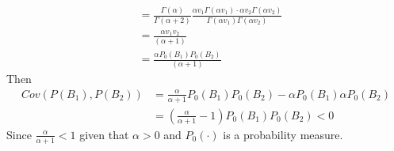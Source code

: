 \documentclass[a4paper, 10pt]{article}
\newcommand{\ds}{ \displaystyle }
\newcommand{\alphaPo}[1]{ \alpha P_0(#1) }
\newcommand{\Bi}[1]{B_#1}
\begin{document}
\begin{enumerate}
\begin{align*}
                        &= \ds\frac{\Gamma(\alpha)}{\Gamma(\alpha+2)}
                            \ds\frac{\alpha v_1\Gamma(\alpha v_1) \cdot \alpha v_2\Gamma(\alpha v_2)}
                            {\Gamma(\alpha v_1)\Gamma(\alpha v_2)}\\
                        &= \frac{\alpha v_1 v_2}{(\alpha +1)}\\
                        &= \frac{\alpha P_0(B_1) P_0(B_2)}{(\alpha +1)}
    \end{align*}
    Then 
    \begin{align*}
        Cov(P(\Bi{1}), P(\Bi{2})) &= \frac{\alpha}{\alpha+1}P_0(B_1)P_0( B_2 ) - \alphaPo{B_1} \alphaPo{B_2}\\
        &= \left( \frac{\alpha}{\alpha+1} - 1 \right) P_0(B_1) P_0(B_2) < 0
    \end{align*}
    Since $\frac{\alpha}{\alpha + 1} < 1$ given that $\alpha >0$ and $P_0(\cdot)$ is a probability measure.
    

\end{enumerate}
\end{document}
